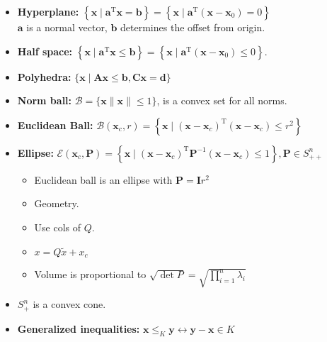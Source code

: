 \begin{itemize}

\item \textbf{Hyperplane:}
$\left\{\bm{x} \mid \bm{a}^{\mathrm{T}} \bm{x}=\bm{b} \right\}=\left\{\bm{x} \mid \bm{a}^{\mathrm{T}}\left(\bm{x}-\bm{x}_{0}\right)=0\right\}$\\
$\bm{a}$ is a normal vector, $\bm{b}$ determines the offset from origin.

\item \textbf{Half space:}
$\left\{\bm{x} \mid \bm{a}^{\mathrm{T}} \bm{x} \leq \bm{b}\right\}=\left\{\bm{x} \mid \bm{a}^{\mathrm{T}}\left(\bm{x}-\bm{x}_{0}\right) \leq 0\right\} .$

\item \textbf{Polyhedra:} $\{\bm{x} \mid \mathbf{A} \bm{x} \leq \bm{b}, \mathbf{C} \bm{x}=\bm{d}\}$

\item \textbf{Norm ball:} $\mathcal{B}=\{\bm{x}\|\bm{x}\| \leq 1\}$, is a convex set for all norms.

\item {\small \textbf{Euclidean Ball:} $\mathcal{B}\left(\bm{x}_{c}, r\right)=\left\{\bm{x} \mid\left(\bm{x}-\bm{x}_{c}\right)^{\mathrm{T}}\left(\bm{x}-\bm{x}_{c}\right) \leq r^{2}\right\}$}



\item {\footnotesize\textbf{Ellipse:}
 $\mathcal{E}\left(\bm{x}_{c}, \mathbf{P}\right)=\left\{\bm{x} \mid\left(\bm{x}-\bm{x}_{c}\right)^{\mathrm{T}} \mathbf{P}^{-1}\left(\bm{x}-\bm{x}_{c}\right) \leq 1\right\}, \mathbf{P} \in S_{++}^{n}$}

\begin{itemize}
    \item Euclidean ball is an ellipse with $\mathbf{P}=\mathbf{I}r^{2}$
    \item Geometry. 
    \item Use cols of $Q$.
    \item $x = Q\tilde x + {x_c}$
    \item Volume is proportional to $\sqrt{\operatorname{det} P}=\sqrt{\prod_{i=1}^{n} \lambda_{i}}$
\end{itemize}

\item $S_{+}^{n}$ is a convex cone.

\item \textbf{Generalized inequalities:} $\bm{x} \leq_{K} \bm{y} \leftrightarrow \bm{y}-\bm{x} \in K$
\end{itemize}

